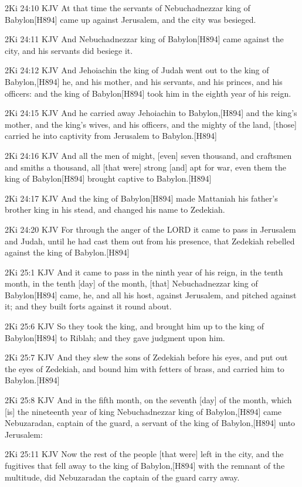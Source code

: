 \documentclass{book}
\begin{document}
2Ki 24:10 KJV
At that time the servants of Nebuchadnezzar king of Babylon[H894] came up against Jerusalem, and the city was besieged.

2Ki 24:11 KJV
And Nebuchadnezzar king of Babylon[H894] came against the city, and his servants did besiege it.

2Ki 24:12 KJV
And Jehoiachin the king of Judah went out to the king of Babylon,[H894] he, and his mother, and his servants, and his princes, and his officers: and the king of Babylon[H894] took him in the eighth year of his reign.

2Ki 24:15 KJV
And he carried away Jehoiachin to Babylon,[H894] and the king's mother, and the king's wives, and his officers, and the mighty of the land, [those] carried he into captivity from Jerusalem to Babylon.[H894]

2Ki 24:16 KJV
And all the men of might, [even] seven thousand, and craftsmen and smiths a thousand, all [that were] strong [and] apt for war, even them the king of Babylon[H894] brought captive to Babylon.[H894]

2Ki 24:17 KJV
And the king of Babylon[H894] made Mattaniah his father's brother king in his stead, and changed his name to Zedekiah.

2Ki 24:20 KJV
For through the anger of the LORD it came to pass in Jerusalem and Judah, until he had cast them out from his presence, that Zedekiah rebelled against the king of Babylon.[H894]

2Ki 25:1 KJV
And it came to pass in the ninth year of his reign, in the tenth month, in the tenth [day] of the month, [that] Nebuchadnezzar king of Babylon[H894] came, he, and all his host, against Jerusalem, and pitched against it; and they built forts against it round about.

2Ki 25:6 KJV
So they took the king, and brought him up to the king of Babylon[H894] to Riblah; and they gave judgment upon him.

2Ki 25:7 KJV
And they slew the sons of Zedekiah before his eyes, and put out the eyes of Zedekiah, and bound him with fetters of brass, and carried him to Babylon.[H894]

2Ki 25:8 KJV
And in the fifth month, on the seventh [day] of the month, which [is] the nineteenth year of king Nebuchadnezzar king of Babylon,[H894] came Nebuzaradan, captain of the guard, a servant of the king of Babylon,[H894] unto Jerusalem:

2Ki 25:11 KJV
Now the rest of the people [that were] left in the city, and the fugitives that fell away to the king of Babylon,[H894] with the remnant of the multitude, did Nebuzaradan the captain of the guard carry away.
\end{document}
